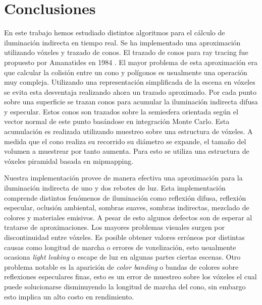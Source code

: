 \chapter{Conclusiones}
\label{chap:conclusion}
En este trabajo hemos estudiado distintos algoritmos para el cálculo de iluminación indirecta en tiempo real. Se ha implementado una aproximación utilizando vóxeles y trazado de conos. El trazado de conos para ray tracing fue propuesto por Amanatides en 1984 \cite{Amanatides:1984:RTC:800031.808589}. El mayor problema de esta aproximación era que calcular la colisión entre un cono y polígonos es usualmente una operación muy compleja. Utilizando una representación simplificada de la escena en vóxeles se evita esta desventaja realizando ahora un trazado aproximado. Por cada punto sobre una superficie se trazan conos para acumular la iluminación indirecta difusa y especular. Estos conos son trazados sobre la semiesfera orientada según el vector normal de este punto basándose en integración Monte Carlo. Esta acumulación es realizada utilizando muestreo sobre una estructura de vóxeles. A medida que el cono realiza su recorrido su diámetro se expande, el tamaño del volumen a muestrear por tanto aumenta. Para esto se utiliza una estructura de vóxeles piramidal basada en mipmapping.

Nuestra implementación provee de manera efectiva una aproximación para la iluminación indirecta de uno y dos rebotes de luz. Esta implementación comprende distintos fenómenos de iluminación como reflexión difusa, reflexión especular, oclusión ambiental, sombras suaves, sombras indirectas, mezclado de colores y materiales emisivos. A pesar de esto algunos defectos son de esperar al tratarse de aproximaciones. Los mayores problemas visuales surgen por discontinuidad entre vóxeles. Es posible obtener valores erróneos por distintas causas como longitud de marcha o errores de voxelización, esto usualmente ocasiona \emph{light leaking} o escape de luz en algunas partes ciertas escenas. Otro problema notable es la aparición de \emph{color banding} o bandas de colores sobre reflexiones especulares finas, esto es un error de muestreo sobre los vóxeles el cual puede solucionarse disminuyendo la longitud de marcha del cono, sin embargo esto implica un alto costo en rendimiento.

